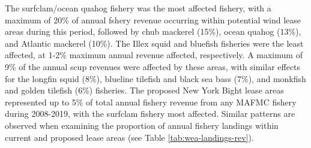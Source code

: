 \documentclass[
  10pt,
]{article}
\let\origtable\table
\let\endorigtable\endtable
\renewenvironment{table}[1][2] {
    \expandafter\origtable\expandafter[H]
} {
    \endorigtable
}
\begin{document}
The surfclam/ocean quahog fishery was the most affected fishery, with a
maximum of 20\% of annual fshery revenue occurring within potential wind
lease areas during this period, followed by chub mackerel (15\%), ocean
quahog (13\%), and Atlantic mackerel (10\%). The Illex squid and
bluefish fisheries were the least affected, at 1-2\% maximum annual
revenue affected, respectively. A maximum of 9\% of the annual scup
revenues were affected by these areas, with similar effects for the
longfin squid (8\%), blueline tilefish and black sea bass (7\%), and
monkfish and golden tilefish (6\%) fisheries. The proposed New York
Bight lease areas represented up to 5\% of total annual fishery revenue
from any MAFMC fishery during 2008-2019, with the surfclam fishery most
affected. Similar patterns are observed when examining the proportion of
annual fishery landings within current and proposed lease areas (see
Table \ref{tab:wea-landings-rev}).

\begin{table}

\caption{\label{tab:wea-landings-rev}Top ten species Landings and Revenue from Wind Energy Areas.}
\centering
{}
\end{table}
\end{document}
